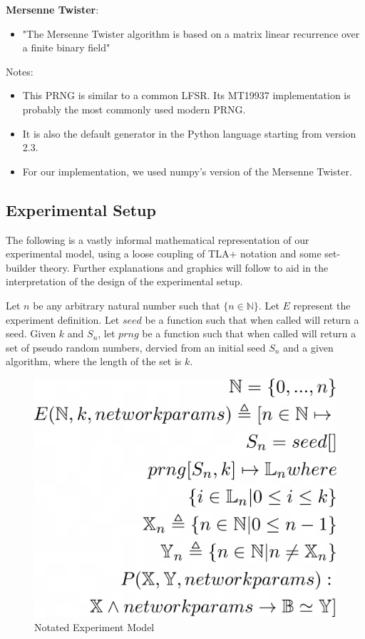 \documentclass[conference]{IEEEtran}
\begin{document}
\noindent\textbf{Mersenne Twister}:
\begin{itemize}
    \item "The Mersenne Twister algorithm is based on a matrix linear recurrence over a finite binary field" \cite{10.1145/146382.146383}
\end{itemize}
Notes:
\begin{itemize}
    \item This PRNG is similar to a common LFSR. Its MT19937 implementation is probably the most commonly used modern PRNG. 
    \item It is also the default generator in the Python language starting from version 2.3. 
    \item For our implementation, we used numpy's version of the Mersenne Twister.
\end{itemize}


\subsection{Experimental Setup}


The following is a vastly informal mathematical representation of our experimental model, using a loose coupling of TLA+ notation and some set-builder theory. Further explanations and graphics will follow to aid in the interpretation of the design of the experimental setup.

\begin{displayquote}
Let $n$ be any arbitrary natural number such that $\{n \in \mathbb{N}\}$.
Let $E$ represent the experiment definition.
Let $seed$ be a function such that when called will return a seed.
Given $k$ and $S_n$, let $prng$ be a function such that when called will return a set of pseudo random numbers,
dervied from an initial seed $S_n$ and a given algorithm, where the length of the set is $k$.
\end{displayquote}

\begin{figure}[H]
\centering
\includegraphics[width=.5\linewidth]{./Images/ModelNotated.png}
\caption{Notated Experiment Model}
\label{fig:Notated Experiment Model}
\end{figure}
\end{document}
